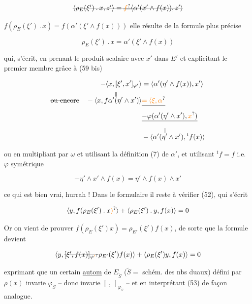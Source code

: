 
\[
\deleted{\langle\rho_E(\xi')\mathbin{.}x,z'\rangle=\deleted{\unsure{f}}\langle\alpha'(x'\wedge f(x)),z'\rangle}
\]

 $f(\rho_E(\xi')\mathbin{.}x)=f(\alpha'(\xi'\wedge f(x)))$ elle résulte  de la formule plus précise

\[
\rho_E(\xi')\mathbin{.}x=\alpha'(\xi'\wedge f(x)) \tag*{(56 bis)}
\]

qui, s'écrit, en prenant le produit scalaire avec $x'$ dans $E'$ et explicitant le premier membre grâce à (59 bis)

\[
\begin{aligned}
-\langle x,[\xi',x']_{\varphi'}\rangle&=\langle\alpha'(\eta'\wedge f(x)),x'\rangle\\
\text{\deleted{ou encore}}\quad -\langle x,f\alpha'\overset{\Vert}{(}\eta'\wedge x')\rangle &\deleted{\unsure{=\langle\xi,\alpha}}\\
&\deleted{-\varphi(\alpha'(\eta'\wedge x'),\unsure{x})}\\
&-\langle\alpha'(\overset{\Vert}{\eta'}\wedge x'),{}^tf(x)\rangle
\end{aligned}
\]

ou en multipliant par $\omega$ et utilisant la définition (7) de $\alpha'$, et utilisant $ {}^tf=f$ i.e.  $\varphi$ symétrique

\[
-\eta'\wedge x'\wedge f(x)=\eta'\wedge f(x)\wedge x'
\]

ce qui est bien vrai, hurrah ! Dans le formulaire  il reste à vérifier (52), qui s'écrit

\[
\langle y,f(\rho_E(\xi')\mathbin{.}x\unsure{)}\rangle+\langle\rho_E(\xi')\mathbin{.}y,f(x)\rangle=0
\]

Or on vient de prouver $f(\rho_E(\xi')x)=\rho_{E'}(\xi')f(x)$,  de sorte que la formule devient

\[
\langle y,\deleted{[\xi',f(x)]_{\varphi\unsure{'}}}\rho_{E'}(\xi')f(x)\rangle+\langle\rho_E(\xi')y,f(x)\rangle=0
\]

exprimant que un certain \uline{autom} de $E_{\widetilde S}$ ($\widetilde S={}$ schém. des nbs duaux) défini par $\rho(x)$ invarie $\varphi_{\widetilde S}$ -- donc invarie $[\ ,\ ]_{\varphi_{\widetilde S}}$ -- et en interprétant (53) de façon analogue.

